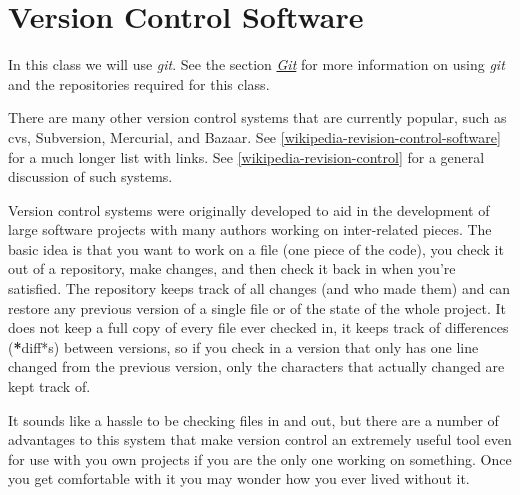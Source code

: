 \documentclass[letterpaper,10pt,english]{sphinxmanual}
\begin{document}
\section{Version Control Software}
\label{versioncontrol::doc}\label{versioncontrol:versioncontrol}\label{versioncontrol:version-control-software}
In this class we will use \emph{git}.  See the section {\hyperref[git:git]{\emph{Git}}}
for more information on using \emph{git} and the repositories required for this
class.

There are many other version control systems that are currently popular,
such as cvs, Subversion, Mercurial, and Bazaar.
See {\hyperref[biblio:wikipedia-revision-control-software]{{[}wikipedia-revision-control-software{]}}} for a much longer list with
links.
See {\hyperref[biblio:wikipedia-revision-control]{{[}wikipedia-revision-control{]}}} for a general discussion of such systems.

Version control systems were originally developed to aid in the development
of large software projects with many authors working on inter-related
pieces.  The basic idea is that you want to work on a file (one piece of the
code), you check it out of a repository, make changes, and then check it
back in when you're satisfied.  The repository keeps track of all changes
(and who made them) and can restore any previous version of a single file or
of the state of the whole project.  It does not keep a full copy of every
file ever checked in, it keeps track of differences ({\color{red}\bfseries{}*}diff*s) between
versions, so if you check in a version that only has one line changed from
the previous version, only the characters that actually changed are kept
track of.

It sounds like a hassle to be checking files in and out, but there are a
number of advantages to this system that make version control an
extremely useful tool even for use with you own projects if you are the only
one working on something.  Once you get comfortable with it you may wonder
how you ever lived without it.
\end{document}
